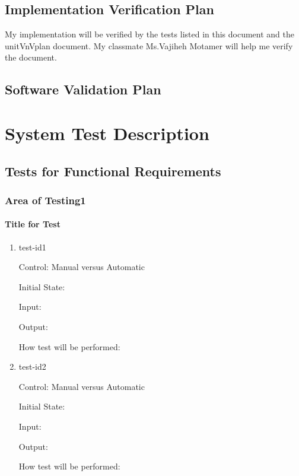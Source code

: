 \documentclass[12pt, titlepage]{article}
\begin{document}
\subsection{Implementation Verification Plan}


My implementation will be verified by the tests listed in this document and the unitVnVplan document. My classmate Ms.Vajiheh Motamer will help me verify the document.	

\subsection{Software Validation Plan}


\section{System Test Description}
	
\subsection{Tests for Functional Requirements}


\subsubsection{Area of Testing1}
		
\paragraph{Title for Test}

\begin{enumerate}

\item{test-id1\\}

Control: Manual versus Automatic
					
Initial State: 
					
Input: 
					
Output: 
					
How test will be performed: 
					
\item{test-id2\\}

Control: Manual versus Automatic
					
Initial State: 
					
Input: 
					
Output: 
					
How test will be performed: 

\end{enumerate}
\end{document}
